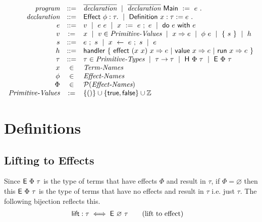 \documentclass{article}
\begin{document}
\[ \begin{array}{rcl}
  \textit{program} &::= &
  \overline{\textit{declaration}} ~ \mid ~
  \overline{\textit{declaration}}~\textsf{Main} ~ := ~ e ~.
  \\
  \textit{declaration} &::=&
    \textsf{Effect} ~ \phi:\tau. ~ \mid ~
    \textsf{Definition}~ x : \tau := e ~.
  \\
  e &::=&
    v ~ \mid ~
    e ~ e ~ \mid ~
    x ~:=~ e ~;~ e ~ \mid ~
    \textsf{do} ~ e ~ \textsf{with} ~ e
  \\
  v &:=&
    x ~ \mid ~
    v \in \textit{Primitive-Values} ~ \mid ~
    x \Rightarrow e ~ \mid ~
    \phi ~ e ~ \mid ~
    \{~ s ~\} ~ \mid ~
    h
  \\
  s &::=&
    e ~;~ s ~ \mid ~
    x ~\leftarrow~ e ~;~ s ~ \mid ~
    e
  \\
  h &::=&
    \textsf{handler} ~ \{~
      \textsf{effect} ~ (x ~ x) ~ x \Rightarrow e ~ | ~
      \textsf{value} ~ x \Rightarrow e ~ | ~
      \textsf{run} ~ x \Rightarrow e
    ~\}
  \\
  \tau &::=&
    \tau \in \textit{Primitive-Types} ~ \mid ~
    \tau \rightarrow \tau ~ \mid ~
    \textsf{H} ~ \Phi ~ \tau ~ \mid ~
    \textsf{E} ~ \Phi ~ \tau
  \\
  x &\in& \textit{Term-Names}
  \\
  \phi &\in& \textit{Effect-Names}
  \\
  \Phi &\in& \mathcal{P}(\textit{Effect-Names})
  \\
  \textit{Primitive-Values} &:=&
    \{  ()  \} \cup \{  \textsf{true}, \textsf{false}  \} \cup \mathbb{Z}
 \end{array} \]

\section{Definitions}

\subsection{Lifting to Effects}

Since $\textsf{E} ~ \Phi ~ \tau$ is the type of terms that have effects $\Phi$ and result in $\tau$,
if $\Phi = \varnothing$ then this $\textsf{E} ~ \Phi ~ \tau$ is the type of terms that have
no effects and result in $\tau$ i.e. just $\tau$. The following bijection reflects this.
\begin{align*}
 \textsf{lift} : \tau & \iff \textsf{E} ~ \varnothing ~ \tau \tag{lift to effect}
\end{align*}
\end{document}
